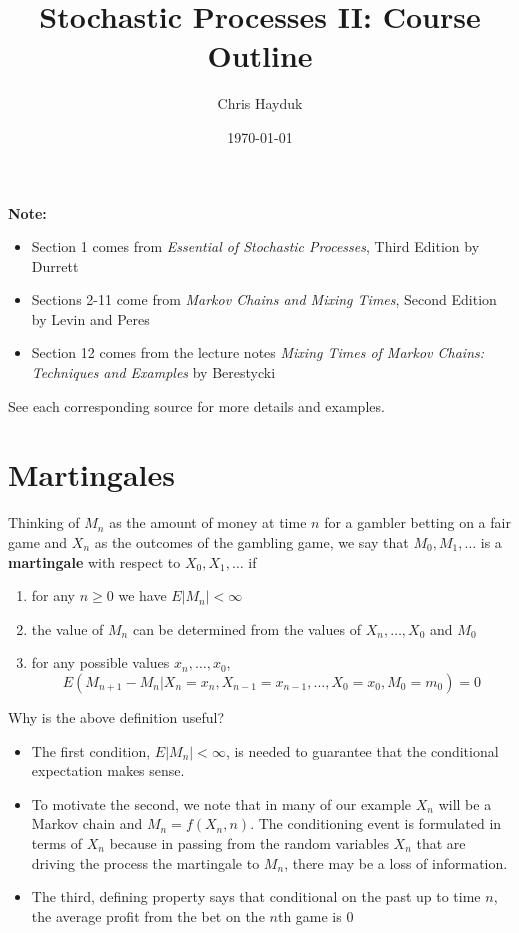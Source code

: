 \documentclass[12pt]{article}
\begin{document}
\title{Stochastic Processes II: Course Outline}

\author{Chris Hayduk}
\date{\today}

\maketitle

\textbf{Note:}
\begin{itemize}
\item Section 1 comes from \textit{Essential of Stochastic Processes}, Third Edition by Durrett
\item Sections 2-11 come from \textit{Markov Chains and Mixing Times}, Second Edition by Levin and Peres
\item Section 12 comes from the lecture notes \textit{Mixing Times of Markov Chains: Techniques and Examples} by Berestycki
\end{itemize}

See each corresponding source for more details and examples.

\section{Martingales}

Thinking of $M_n$ as the amount of money at time $n$ for a gambler betting on a fair game and $X_n$ as the outcomes of the gambling game, we say that $M_0, M_1, \ldots$ is a \textbf{martingale} with respect to $X_0, X_1, \ldots$ if
\begin{enumerate}
\item for any $n \geq 0$ we have $E|M_n| < \infty$
\item the value of $M_n$ can be determined from the values of $X_n, \ldots, X_0$ and $M_0$
\item for any possible values $x_n, \ldots, x_0$, $$E(M_{n+1} - M_n | X_n = x_n, X_{n-1} = x_{n-1}, \ldots, X_0 = x_0, M_0 = m_0) = 0$$
\end{enumerate}

Why is the above definition useful?
\begin{itemize}
\item The first condition, $E|M_n| < \infty$, is needed to guarantee that the conditional expectation makes sense.
\item To motivate the second, we note that in many of our example $X_n$ will be a Markov chain and $M_n = f(X_n, n)$. The conditioning event is formulated in terms of $X_n$ because in passing from the random variables $X_n$ that are driving the process the martingale to $M_n$, there may be a loss of information.
\item The third, defining property says that conditional on the past up to time $n$, the average profit from the bet on the $n$th game is $0$
\end{itemize}
\end{document}
